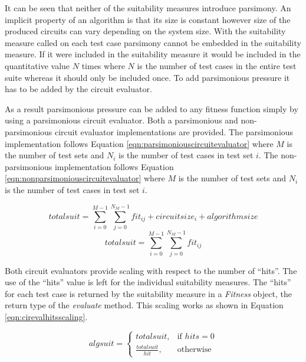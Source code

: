 It can be seen that neither of the suitability measures introduce parsimony.
An implicit property of an algorithm is that its size is constant however size of the produced circuits can vary depending on the system size.
With the suitability measure called on each test case parsimony cannot be embedded in the suitability measure.
If it were included in the suitability measure it would be included in the quantitative value $N$ times where $N$ is the number of test cases in the entire test suite whereas it should only be included once.
To add parsimonious pressure it has to be added by the circuit evaluator.

As a result parsimonious pressure can be added to any fitness function simply by using a parsimonious circuit evaluator.
Both a parsimonious and non-parsimonious circuit evaluator implementations are provided.
The parsimonious implementation follows Equation \ref{eqn:parsimoniouscircuitevaluator} where $M$ is the number of test sets and $N_i$ is the number of test cases in test set $i$.
The non-parsimonious implementation follows Equation \ref{eqn:nonparsimoniouscircuitevaluator} where $M$ is the number of test sets and $N_i$ is the number of test cases in test set $i$.

\begin{equation}
 totalsuit = \sum_{i=0}^{M-1}\sum_{j=0}^{N_M-1}fit_{ij}+circuitsize_i+algorithmsize
\label{eqn:parsimoniouscircuitevaluator}
\end{equation}
\begin{equation}
 totalsuit = \sum_{i=0}^{M-1}\sum_{j=0}^{N_M-1}fit_{ij}
\label{eqn:nonparsimoniouscircuitevaluator}
\end{equation}

Both circuit evaluators provide scaling with respect to the number of ``hits''.
The use of the ``hits'' value is left for the individual suitability measures.
The ``hits'' for each test case is returned by the suitability measure in a \emph{Fitness} object, the return type of the \emph{evaluate} method.
This scaling works as shown in Equation \ref{eqn:cirevalhitsscaling}.

\begin{equation}
 algsuit = 
\left\{
  \begin{array}{cc} totalsuit, & \mbox{if } hits={0}\\ 
  \frac{totalsuit}{hit}, & \mbox{otherwise}\end{array}
\right.
\label{eqn:cirevalhitsscaling}
\end{equation}

